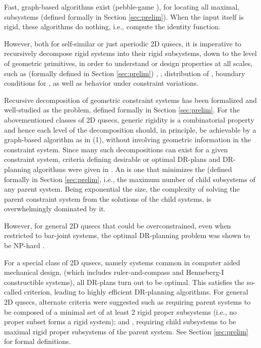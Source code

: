\medskip\noindent
{}
Fast, graph-based algorithms exist (pebble-game \cite{Jacobs:1997:PG,lee2005finding}), for locating all maximal,  subsystems (defined formally in Section \ref{sec:prelim}). When the input itself is rigid, these algorithms do nothing, i.e., compute the identity function.

However, both for self-similar or just aperiodic 2D qusecs, it is imperative to recursively decompose rigid systems into their rigid subsystems, down to the level of geometric primitives, in order to understand or design properties at all scales, such as (formally defined in Section \ref{sec:prelim}) , , distribution of , boundary conditions for , as well as behavior under constraint variations.

\medskip\noindent
{}
Recursive decomposition of geometric constraint systems has been formalized \cite{hoffman2001decompositionI,hoffman2001decompositionII} and well-studied \cite{jermann2006decomposition,sitharam2005combinatorial} as the  problem, defined formally in Section \ref{sec:prelim}. For the abovementioned classes of 2D qusecs, generic rigidity is a combinatorial property and hence each level of the decomposition should, in principle, be achievable by a graph-based algorithm as in (1), without involving geometric information in the constraint system. Since many such decompositions can exist for a given constraint system, criteria defining desirable or optimal DR-plans and DR-planning algorithms were given in \cite{hoffman2001decompositionI}. An  is one that minimizes the  (defined formally in Section \ref{sec:prelim}, i.e., the maximum number of child subsystems of any parent system. Being exponential the size, the complexity of solving the parent constraint system from the solutions of the child systems, is overwhelmingly dominated by it.

However, for general 2D qusecs that could be overconstrained, even when restricted to bar-joint systems, the optimal DR-planning problem was shown to be NP-hard \cite{lomonosov2004graph}.

\medskip\noindent
{}
For a special class of 2D qusecs, namely  systems  \cite{fudos1997graph,owen1991algebraic,joan-arinyo2004revisiting}  common in computer aided mechanical design, (which includes ruler-and-compass and Henneberg-I constructible systems), all DR-plans turn out to be optimal. This satisfies the so-called  criterion, leading to highly efficient DR-planning algorithms. For general 2D qusecs, alternate criteria were suggested such as  requiring parent systems to be composed of a minimal set of at least 2 rigid proper subsystems (i.e., no proper subset forms a rigid system); and , requiring child subsystems to be maximal rigid proper subsystems of the parent system. See Section \ref{sec:prelim} for formal definitions.

